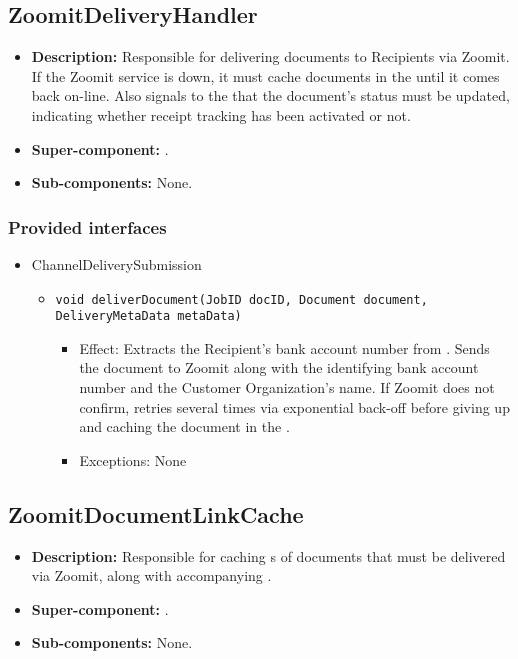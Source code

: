 \subsection{ZoomitDeliveryHandler}
\begin{itemize}
    \item \textbf{Description:} Responsible for delivering documents to Recipients via Zoomit. If the Zoomit service is down, it must cache documents in the  until it comes back on-line. Also signals to the  that the document's status must be updated, indicating whether receipt tracking has been activated or not.
    \item \textbf{Super-component:} .
    \item \textbf{Sub-components:} None.
\end{itemize}

\subsubsection*{Provided interfaces}
\begin{itemize}
    \item ChannelDeliverySubmission
    \begin{itemize}
        \item \texttt{void deliverDocument(JobID docID, Document document, DeliveryMetaData metaData)}
        \begin{itemize}
            \item Effect: Extracts the Recipient's bank account number from . Sends the document to Zoomit along with the identifying bank account number and the Customer Organization's name. If Zoomit does not confirm, retries several times via exponential back-off before giving up and caching the document in the .
            \item Exceptions: None
        \end{itemize}
    \end{itemize}
\end{itemize}

\subsection{ZoomitDocumentLinkCache}
\begin{itemize}
    \item \textbf{Description:} Responsible for caching s of documents that must be delivered via Zoomit, along with accompanying .
    \item \textbf{Super-component:} .
    \item \textbf{Sub-components:} None.
\end{itemize}

